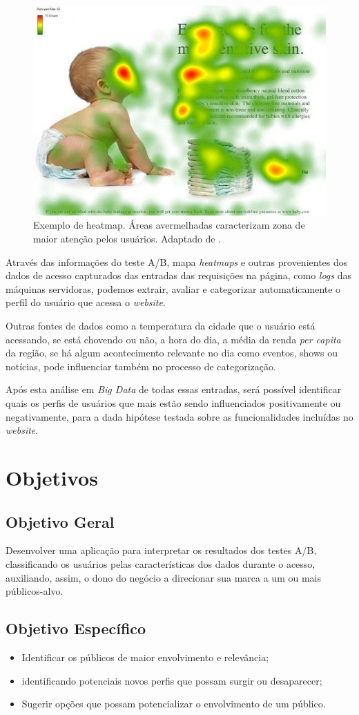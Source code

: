 \documentclass[12pt]{article}
\begin{document}
\begin{figure}[ht]
\centering
\includegraphics[width=.5\textwidth]{fig1.jpg}
\caption{Exemplo de heatmap. Áreas avermelhadas caracterizam zona de maior atenção pelos usuários. Adaptado de \cite{goward:13}.}
\label{fig:heatmap1}
\end{figure}

Através das informações do teste A/B, mapa \textit{heatmaps} e outras provenientes dos dados de acesso capturados das entradas das requisições na página, como \textit{logs} das máquinas servidoras, podemos extrair, avaliar e categorizar automaticamente o perfil do usuário que acessa o \textit{website}.

Outras fontes de dados como a temperatura da cidade que o usuário está acessando, se está chovendo ou não, a hora do dia, a média da renda \textit{per capita} da região, se há algum acontecimento relevante no dia como eventos, shows ou notícias, pode influenciar também no processo de categorização.

Após esta análise em \textit{Big Data} de todas essas entradas, será possível identificar quais os perfis de usuários que mais estão sendo influenciados positivamente ou negativamente, para a dada hipótese testada sobre as funcionalidades incluídas no \textit{website}.

\section{Objetivos}
\subsection{Objetivo Geral}
Desenvolver uma aplicação para interpretar os resultados dos testes A/B, classificando os usuários pelas características dos dados durante o acesso, auxiliando, assim, o dono do negócio a direcionar sua marca a um ou mais públicos-alvo.

\subsection{Objetivo Específico}
\begin{itemize}
\item Identificar os públicos de maior envolvimento e relevância;
\item identificando potenciais novos perfis que possam surgir ou desaparecer;
\item Sugerir opções que possam potencializar o envolvimento de um público.
\end{itemize}
\end{document}
